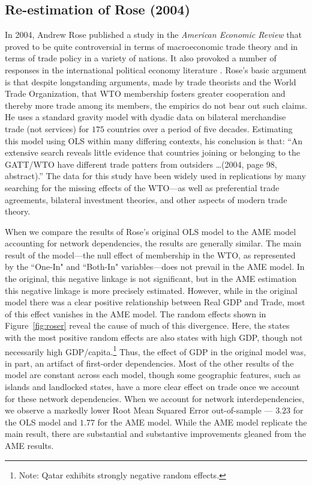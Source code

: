 \subsection{Re-estimation of Rose (2004)}

\nocite{rose:2004}
In 2004, Andrew Rose published a study in the \textit{American Economic Review} that proved to be quite controversial in terms of macroeconomic trade theory and in terms of trade policy in a variety of nations. It also provoked a number of responses in the international political economy literature \citep{tomz:etal:2007,ward:etal:2013}.  Rose's basic argument is that despite longstanding arguments, made by trade theorists and the World Trade Organization, that WTO membership fosters greater cooperation and thereby more trade among its members, the empirics do not bear out such claims. He uses a standard gravity model with dyadic data on bilateral merchandise trade (not services) for $175$ countries over a period of five decades. Estimating this model using OLS within many differing contexts, his conclusion is that: ``An extensive search reveals little evidence that countries joining or belonging to the GATT/WTO have different trade patters from outsiders \ldots (2004, page 98, abstract).''  The data for this study have been widely used in replications by many searching for the missing effects of the WTO---as well as preferential trade agreements, bilateral investment theories, and other aspects of modern trade theory.  

When we compare the results of Rose's original OLS model to the AME model accounting for network dependencies, the results are generally similar. The main result of the model---the null effect of membership in the WTO, as represented by the ``One-In" and ``Both-In" variables---does not prevail in the AME model. In the original, this negative linkage is not significant, but in the AME estimation this negative linkage is more precisely estimated. However, while in the original model there was a clear positive relationship between Real GDP and Trade, most of this effect vanishes in the AME model. The random effects shown in Figure~\ref{fig:roser} reveal the cause of much of this divergence. Here, the states with the most positive random effects are also states with high GDP, though not necessarily high GDP/capita.\footnote{Note: Qatar exhibits strongly negative random effects.} Thus, the effect of GDP in the original model was, in part, an artifact of first-order dependencies. Most of the other results of the model are constant across each model, though some geographic features, such as islands and landlocked states, have a more clear effect on trade once we account for these network dependencies. When we account for network interdependencies, we observe a markedly lower Root Mean Squared Error out-of-sample --- $3.23$ for the OLS model and $1.77$ for the AME model. While the AME model replicate the main result, there are substantial and substantive improvements gleaned from the AME results.

